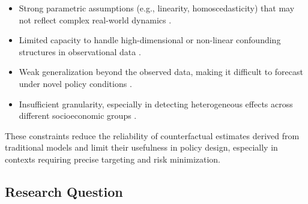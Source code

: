 \begin{itemize}
  \item Strong parametric assumptions (e.g., linearity, homoscedasticity) that may not reflect complex real-world dynamics \citep{hellwig2021predicting}.
  \item Limited capacity to handle high-dimensional or non-linear confounding structures in observational data \citep{vallarino2024machine}.
  \item Weak generalization beyond the observed data, making it difficult to forecast under novel policy conditions \citep{idb2024ai}.
  \item Insufficient granularity, especially in detecting heterogeneous effects across different socioeconomic groups \citep{wager2019causal}.
\end{itemize}

These constraints reduce the reliability of counterfactual estimates derived from traditional models and limit their usefulness in policy design, especially in contexts requiring precise targeting and risk minimization.


\subsection{Research Question}\label{subsec:research_question}

